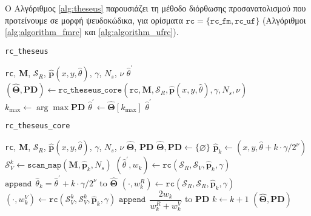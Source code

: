 Ο Αλγόριθμος \ref{alg:theseus} παρουσιάζει τη μέθοδο διόρθωσης προσανατολισμού
που προτείνουμε σε μορφή ψευδοκώδικα, για ορίσματα $\texttt{rc} =
\{\texttt{rc\_fm}, \texttt{rc\_uf}\}$ (Αλγόριθμοι \ref{alg:algorithm_fmrc} και
\ref{alg:algorithm_ufrc}).

\begin{algorithm}[!h]
  \caption{\texttt{rc\_theseus}}
  \begin{spacing}{1.5}
  \begin{algorithmic}[1]
    \REQUIRE \texttt{rc}, $\bm{M}$, $\mathcal{S}_R$, $\hat{\bm{p}}(x, y, \hat{\theta})$, $\gamma$, $N_s$, $\nu$
    \ENSURE $\hat{\theta}^\prime$
    \STATE $(\hat{\bm{\Theta}}, \textbf{PD}) \leftarrow \texttt{rc\_theseus\_core}(\texttt{rc}, \bm{M}, \mathcal{S}_R, \hat{\bm{p}}(x, y, \hat{\theta}), \gamma, N_s, \nu)$
    \STATE $k_{\max} \leftarrow \arg\max\textbf{PD}$
    \STATE $\hat{\theta}^\prime \leftarrow \hat{\bm{\Theta}}[k_{\max}]$
    \RETURN $\hat{\theta}^\prime$
  \end{algorithmic}
  \end{spacing}
  \label{alg:theseus}
\end{algorithm}

\begin{algorithm}[!h]
  \caption{\texttt{rc\_theseus\_core}}
  \begin{spacing}{1.5}
  \begin{algorithmic}[1]
    \REQUIRE \texttt{rc}, $\bm{M}$, $\mathcal{S}_R$, $\hat{\bm{p}}(x, y, \hat{\theta})$, $\gamma$, $N_s$, $\nu$
    \ENSURE $\hat{\bm{\Theta}}$, $\textbf{PD}$
    \STATE $\hat{\bm{\Theta}}, \textbf{PD} \leftarrow \{\varnothing\}$
      \STATE $\hat{\bm{p}}_k \leftarrow (x, y, \hat{\theta} + k \cdot \gamma/2^\nu)$
      \STATE $\mathcal{S}_V^k \leftarrow \texttt{scan\_map}(\bm{M}, \hat{\bm{p}}_k, N_s)$
      \STATE $(\hat{\theta}^\prime, w_k) \leftarrow \texttt{rc}(\mathcal{S}_R, \mathcal{S}_V, \hat{\bm{p}}_k, \gamma)$
      \STATE $\texttt{append} \ \ \hat{\theta}_k = \hat{\theta}^\prime + k \cdot \gamma/2^\nu$ to $\hat{\bm{\Theta}}$
      \STATE $(\cdot,w_k^{R}) \leftarrow \texttt{rc}(\mathcal{S}_R, \mathcal{S}_R, \hat{\bm{p}}_k, \gamma)$
      \STATE $(\cdot,w_k^{V}) \leftarrow \texttt{rc}(\mathcal{S}_V^k, \mathcal{S}_V^k, \hat{\bm{p}}_k, \gamma)$
      \STATE $\texttt{append} \ \ \dfrac{2w_k}{w_k^{R} + w_k^{V}}$ to \textbf{PD}
      \STATE $k \leftarrow k + 1$
    \ENDFOR
    \RETURN $(\hat{\bm{\Theta}}, \textbf{PD})$
  \end{algorithmic}
  \end{spacing}
  \label{alg:core_theseus}
\end{algorithm}

